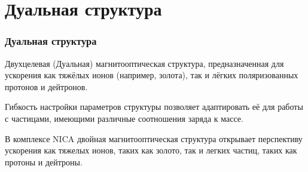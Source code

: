 \section{Дуальная структура} %

\begin{frame}
    \frametitle{Дуальная структура}
\par Двухцелевая (Дуальная) магнитооптическая структура, предназначенная для ускорения как тяжёлых ионов (например, золота), так и лёгких поляризованных протонов и дейтронов.
 \newline
 \par Гибкость настройки параметров структуры позволяет адаптировать её для работы с частицами, имеющими различные соотношения заряда к массе.
 \newline
 \par В комплексе NICA двойная магнитооптическая структура открывает перспективу ускорения как тяжелых ионов, таких как золото, так и легких частиц, таких как протоны и дейтроны.
\end{frame}